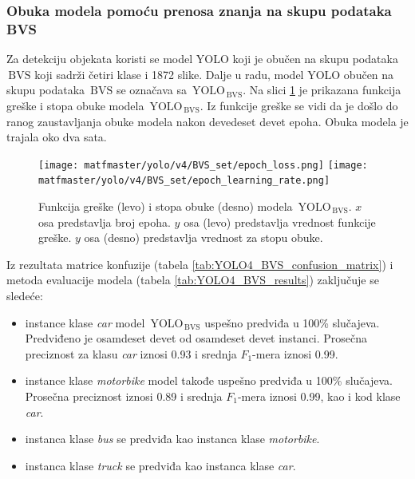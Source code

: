 \documentclass[12pt,oneside]{memoir}
\newcommand{\yolo}{\ensuremath{\,\textrm{YOLO}}}
\newcommand{\bvs}{\ensuremath{\,\textrm{BVS}}}
\begin{document}
\subsubsection{Obuka modela pomoću prenosa znanja na skupu podataka BVS}

Za detekciju objekata koristi se model YOLO koji je obučen na skupu podataka \bvs{} koji sadrži četiri klase i 1872 slike. Dalje u radu, model YOLO obučen na skupu podataka \bvs{} se označava sa $\yolo_{\bvs}$. Na slici \ref{fig:YOLO4_BVS_loss} je prikazana funkcija greške i stopa obuke modela $\yolo_{\bvs}$. Iz funkcije greške se vidi da je došlo do ranog zaustavljanja obuke modela nakon devedeset devet epoha. Obuka modela je trajala oko dva sata.

\begin{figure}[htb]
\centering
    \texttt{[image: matfmaster/yolo/v4/BVS\_set/epoch\_loss.png]}
    \texttt{[image: matfmaster/yolo/v4/BVS\_set/epoch\_learning\_rate.png]}
\caption{Funkcija greške (levo) i stopa obuke (desno) modela $\yolo_{\bvs}$. $x$ osa predstavlja broj epoha. $y$ osa (levo) predstavlja vrednost funkcije greške. $y$ osa (desno) predstavlja vrednost za stopu obuke.}
\label{fig:YOLO4_BVS_loss}
\end{figure}


Iz rezultata matrice konfuzije (tabela \ref{tab:YOLO4_BVS_confusion_matrix}) i metoda evaluacije modela (tabela \ref{tab:YOLO4_BVS_results}) zaključuje se sledeće:
\begin{itemize}
    \item instance klase \textit{car} model $\yolo_{\bvs}$ uspešno predviđa u 100\% slučajeva. Predviđeno je osamdeset devet od osamdeset devet instanci. Prosečna preciznost za klasu \textit{car} iznosi 0.93 i srednja $F_1$-mera iznosi 0.99.
    \item instance klase \textit{motorbike} model takođe uspešno predviđa u 100\% slučajeva. Prosečna preciznost iznosi 0.89 i srednja $F_1$-mera iznosi 0.99, kao i kod klase \textit{car}.
    \item instanca klase \textit{bus} se predviđa kao instanca klase \textit{motorbike}.
    \item instanca klase \textit{truck} se predviđa kao instanca klase \textit{car}.
\end{itemize}
\end{document}

